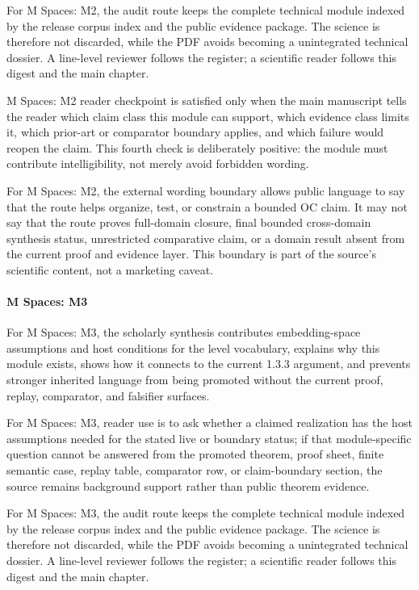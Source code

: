 For M Spaces: M2, the audit route keeps the complete technical module indexed by the release corpus index and the public evidence package. The science is therefore not discarded, while the PDF avoids becoming a unintegrated technical dossier. A line-level reviewer follows the register; a scientific reader follows this digest and the main chapter.


M Spaces: M2 reader checkpoint is satisfied only when the main manuscript tells the reader which claim class this module can support, which evidence class limits it, which prior-art or comparator boundary applies, and which failure would reopen the claim. This fourth check is deliberately positive: the module must contribute intelligibility, not merely avoid forbidden wording.


For M Spaces: M2, the external wording boundary allows public language to say that the route helps organize, test, or constrain a bounded OC claim. It may not say that the route proves full-domain closure, final bounded cross-domain synthesis status, unrestricted comparative claim, or a domain result absent from the current proof and evidence layer. This boundary is part of the source's scientific content, not a marketing caveat.


\paragraph{M Spaces: M3}

For M Spaces: M3, the scholarly synthesis contributes embedding-space assumptions and host conditions for the level vocabulary, explains why this module exists, shows how it connects to the current 1.3.3 argument, and prevents stronger inherited language from being promoted without the current proof, replay, comparator, and falsifier surfaces.


For M Spaces: M3, reader use is to ask whether a claimed realization has the host assumptions needed for the stated live or boundary status; if that module-specific question cannot be answered from the promoted theorem, proof sheet, finite semantic case, replay table, comparator row, or claim-boundary section, the source remains background support rather than public theorem evidence.


For M Spaces: M3, the audit route keeps the complete technical module indexed by the release corpus index and the public evidence package. The science is therefore not discarded, while the PDF avoids becoming a unintegrated technical dossier. A line-level reviewer follows the register; a scientific reader follows this digest and the main chapter.


